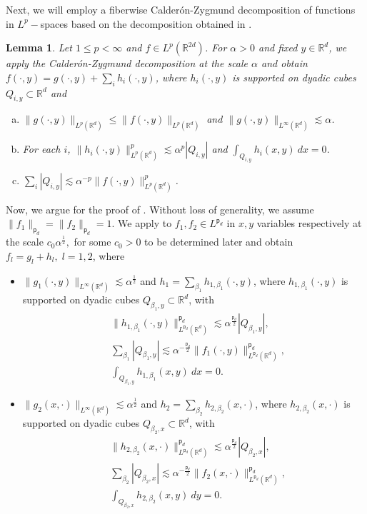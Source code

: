 \documentclass[a4paper,reqno]{amsart}
\newtheorem{lemma}[theorem]{Lemma}
\theoremstyle{definition}
\theoremstyle{remark}
\numberwithin{equation}{section}
\newcommand{\R}{{\mathbb {R}}}
\begin{document}
	
	Next, we will employ a fiberwise Calder\'on-Zygmund decomposition of functions in $L^p-$spaces based on the decomposition obtained in \cite{Bernicot}. 
	\begin{lemma}\label{fiberwiseCZ}
		Let $1\leq p<\infty$ and $f\in L^p(\R^{2d})$. For $\alpha>0$ and fixed $y\in \R^d$, we apply the Calder\'on-Zygmund decomposition at the scale $\alpha$ and obtain $f(\cdot,y)=g(\cdot,y)+\sum\limits_{i}h_i(\cdot,y)$, where $h_i(\cdot,y)$ is supported on dyadic cubes $Q_{i,y}\subset\R^d$ and
		\begin{enumerate}[(a)]
			\item $\|g(\cdot,y)\|_{L^p(\R^d)}\leq\|f(\cdot,y)\|_{L^p(\R^d)}$ and $\|g(\cdot,y)\|_{L^\infty(\R^d)}\lesssim\alpha$.
			\item For each $i$, $\|h_i(\cdot,y)\|_{L^p(\R^d)}^p\lesssim\alpha^p|Q_{i,y}|$ and $\int_{Q_{i,y}}h_i(x,y)~dx=0$.
			\item $\sum\limits_i|Q_{i,y}|\lesssim\alpha^{-p}\|f(\cdot,y)\|_{L^p(\R^d)}^p$.
		\end{enumerate}
	\end{lemma}
	Now, we argue for the proof of . Without loss of generality, we assume $\|f_1\|_{{\mathsf{p}_d}}=\|f_2\|_{{\mathsf{p}_d}}=1$. We apply  to $f_1,f_2\in L^{\mathsf{p}_d}$ in $x,y$ variables respectively at the scale $c_0\alpha^{\frac{1}{2}},$ for some $c_0>0$ to be determined later and obtain $f_l=g_l+h_l,\;l=1,2$, where
	\begin{itemize}
		\item $\|g_1(\cdot,y)\|_{L^\infty(\R^d)}\lesssim\alpha^\frac{1}{2}$ and $h_1=\sum\limits_{\beta_1}h_{1,\beta_1}(\cdot,y)$, where $h_{1,\beta_1}(\cdot,y)$ is supported on dyadic cubes $Q_{\beta_1,y}\subset\R^d$, with
		\begin{align*}
			&\|h_{1,\beta_1}(\cdot,y)\|_{L^{{\mathsf{p}_d}}(\R^d)}^{\mathsf{p}_d}\lesssim\alpha^\frac{\mathsf{p}_d}{2}|Q_{\beta_1,y}|,\\
			&\sum\limits_{\beta_1}|Q_{\beta_1,y}|\lesssim\alpha^{-\frac{\mathsf{p}_d}{2}}\|f_1(\cdot,y)\|_{L^{{\mathsf{p}_d}}(\R^d)}^{\mathsf{p}_d},\\
			&\int_{Q_{\beta_1,y}}h_{1,\beta_1}(x,y)~dx=0.
		\end{align*}
		\item $\|g_2(x,\cdot)\|_{L^\infty(\R^d)}\lesssim\alpha^\frac{1}{2}$ and $h_2=\sum\limits_{\beta_2}h_{2,\beta_2}(x,\cdot)$, where $h_{2,\beta_2}(x,\cdot)$ is supported on dyadic cubes $Q_{\beta_2,x}\subset\R^d$, with
		\begin{align*}
			&\|h_{2,\beta_2}(x,\cdot)\|_{L^{{\mathsf{p}_d}}(\R^d)}^{\mathsf{p}_d}\lesssim\alpha^\frac{\mathsf{p}_d}{2}|Q_{\beta_2,x}|,\\
			&\sum\limits_{\beta_2}|Q_{\beta_2,x}|\lesssim\alpha^{-\frac{\mathsf{p}_d}{2}}\|f_2(x,\cdot)\|_{L^{{\mathsf{p}_d}}(\R^d)}^{\mathsf{p}_d},\\
			&\int_{Q_{\beta_2,x}}h_{2,\beta_2}(x,y)~dy=0.
		\end{align*}
	\end{itemize}
\end{document}
